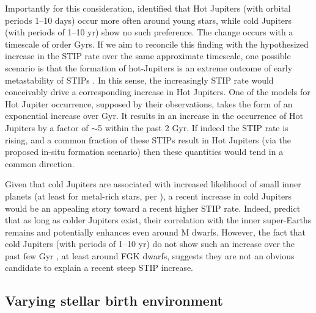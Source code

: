 \documentclass[twocolumn]{aastex631}
\begin{document}
Importantly for this consideration, \cite{miyazaki_evidence_2023} identified that Hot Jupiters (with orbital periods 1–10 days) occur more often around young stars, while cold Jupiters (with periods of 1–10 yr) show no such preference. The change occurs with a timescale of order Gyrs. If we aim to reconcile this finding with the hypothesized increase in the STIP rate over the same approximate timescale, one possible scenario is that the formation of hot-Jupiters is an extreme outcome of early metastability of STIPs \citep{boley_situ_2016}. In this sense, the increasingly STIP rate would conceivably drive a corresponding increase in Hot Jupiters. One of the  \cite{miyazaki_evidence_2023} models for Hot Jupiter occurrence, supposed by their observations, takes the form of an exponential increase over Gyr. It results in an increase in the occurrence of Hot Jupiters by a factor of $\sim$5 within the past 2 Gyr. If indeed the STIP rate is rising, and a common fraction of these STIPs result in Hot Jupiters (via the proposed in-situ formation scenario) then these quantities would tend in a common direction. 

Given that cold Jupiters are associated with increased likelihood of small inner planets (at least for metal-rich stars, per \citealt{bryan_friends_2024}), a recent increase in cold Jupiters would be an appealing story toward a recent higher STIP rate. Indeed, \cite{chachan_small_2023} predict that as long as colder Jupiters exist, their correlation with the inner super-Earths remains and potentially enhances even around M dwarfs. However, the fact that cold Jupiters (with periods of 1–10 yr) do not show such an increase over the past few Gyr \citep{miyazaki_evidence_2023}, at least around FGK dwarfs, suggests they are not an obvious candidate to explain a recent steep STIP increase.   

\subsection{Varying stellar birth environment}
\end{document}
